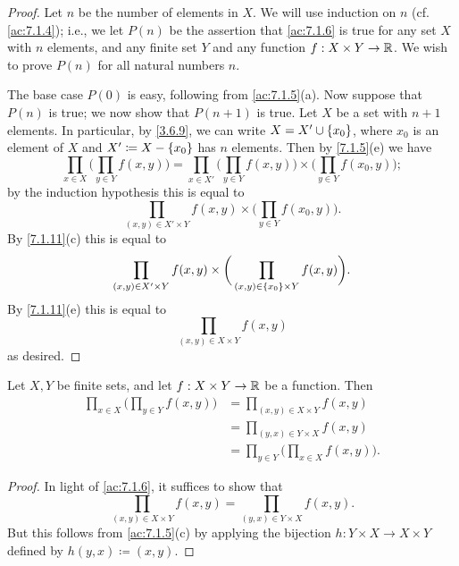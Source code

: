 \begin{proof}
  Let \(n\) be the number of elements in \(X\).
  We will use induction on \(n\) (cf. \cref{ac:7.1.4});
  i.e., we let \(P(n)\) be the assertion that \cref{ac:7.1.6} is true for any set \(X\) with \(n\) elements, and any finite set \(Y\) and any function \(f : X \times Y \to \mathbb{R}\).
  We wish to prove \(P(n)\) for all natural numbers \(n\).

  The base case \(P(0)\) is easy, following from \cref{ac:7.1.5}(a).
  Now suppose that \(P(n)\) is true;
  we now show that \(P(n + 1)\) is true.
  Let \(X\) be a set with \(n + 1\) elements.
  In particular, by \cref{3.6.9}, we can write \(X = X' \cup \left\lbrace x_0\right\rbrace\), where \(x_0\) is an element of \(X\) and \(X' \coloneqq X - \left\lbrace x_0\right\rbrace\) has \(n\) elements.
  Then by \cref{7.1.5}(e) we have
  \[
    \prod_{x \in X} \bigg(\prod_{y \in Y} f(x, y)\bigg) = \prod_{x \in X'} \bigg(\prod_{y \in Y} f(x, y)\bigg) \times \bigg(\prod_{y \in Y} f(x_0, y)\bigg);
  \]
  by the induction hypothesis this is equal to
  \[
    \prod_{(x, y) \in X' \times Y} f(x, y) \times \bigg(\prod_{y \in Y} f(x_0, y)\bigg).
  \]
  By \cref{7.1.11}(c) this is equal to
  \[
    \prod_{(x, y) \in X' \times Y} f(x, y) \times \bigg(\prod_{(x, y) \in \left\lbrace x_0\right\rbrace \times Y} f(x, y)\bigg).
  \]
  By \cref{7.1.11}(e) this is equal to
  \[
    \prod_{(x, y) \in X \times Y} f(x, y)
  \]
  as desired.
\end{proof}

\begin{ac}\label{ac:7.1.7}
  Let \(X, Y\) be finite sets, and let \(f : X \times Y \to \mathbb{R}\) be a function.
  Then
  \begin{align*}
    \prod_{x \in X} \bigg(\prod_{y \in Y} f(x, y)\bigg) & = \prod_{(x, y) \in X \times Y} f(x, y)                \\
                                                        & = \prod_{(y, x) \in Y \times X} f(x, y)                \\
                                                        & = \prod_{y \in Y} \bigg(\prod_{x \in X} f(x, y)\bigg).
  \end{align*}
\end{ac}

\begin{proof}
  In light of \cref{ac:7.1.6}, it suffices to show that
  \[
    \prod_{(x, y) \in X \times Y} f(x, y) = \prod_{(y, x) \in Y \times X} f(x, y).
  \]
  But this follows from \cref{ac:7.1.5}(c) by applying the bijection \(h : Y \times X \to X \times Y\) defined by \(h(y, x) \coloneqq (x, y)\).
\end{proof}

